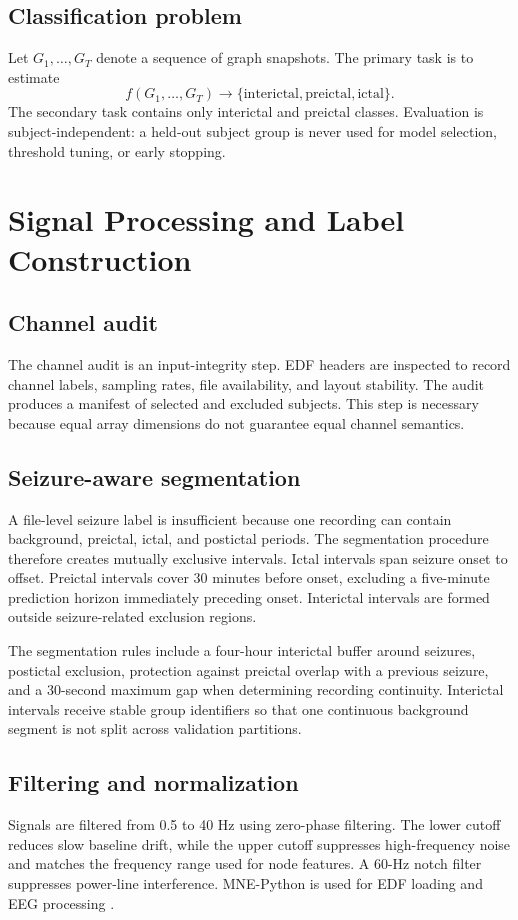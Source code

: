 \documentclass[conference]{IEEEtran}
\begin{document}
\subsection{Classification problem}
Let $G_1,\ldots,G_T$ denote a sequence of graph snapshots. The primary task is to estimate
\begin{equation}
 f(G_1,\ldots,G_T) \rightarrow \{\text{interictal},\text{preictal},\text{ictal}\}.
\end{equation}
The secondary task contains only interictal and preictal classes. Evaluation is subject-independent: a held-out subject group is never used for model selection, threshold tuning, or early stopping.

\section{Signal Processing and Label Construction}
\subsection{Channel audit}
The channel audit is an input-integrity step. EDF headers are inspected to record channel labels, sampling rates, file availability, and layout stability. The audit produces a manifest of selected and excluded subjects. This step is necessary because equal array dimensions do not guarantee equal channel semantics.

\subsection{Seizure-aware segmentation}
A file-level seizure label is insufficient because one recording can contain background, preictal, ictal, and postictal periods. The segmentation procedure therefore creates mutually exclusive intervals. Ictal intervals span seizure onset to offset. Preictal intervals cover 30 minutes before onset, excluding a five-minute prediction horizon immediately preceding onset. Interictal intervals are formed outside seizure-related exclusion regions.

The segmentation rules include a four-hour interictal buffer around seizures, postictal exclusion, protection against preictal overlap with a previous seizure, and a 30-second maximum gap when determining recording continuity. Interictal intervals receive stable group identifiers so that one continuous background segment is not split across validation partitions.

\subsection{Filtering and normalization}
Signals are filtered from 0.5 to 40 Hz using zero-phase filtering. The lower cutoff reduces slow baseline drift, while the upper cutoff suppresses high-frequency noise and matches the frequency range used for node features. A 60-Hz notch filter suppresses power-line interference. MNE-Python is used for EDF loading and EEG processing \cite{gramfort2013mne,gramfort2014mne}.
\end{document}
